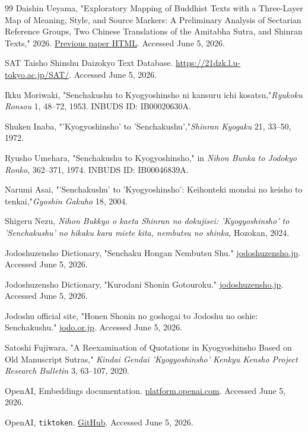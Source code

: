 \documentclass[uplatex,dvipdfmx,11pt,a4paper]{jsarticle}
\begin{document}
\begin{thebibliography}{99}
Daishin Ueyama, "Exploratory Mapping of Buddhist Texts with a Three-Layer Map of Meaning, Style, and Source Markers: A Preliminary Analysis of Sectarian Reference Groups, Two Chinese Translations of the Amitabha Sutra, and Shinran Texts," 2026. \href{https://dueyama.github.io/buddhist-text-embedding-map/paper/}{Previous paper HTML}. Accessed June 5, 2026.

SAT Taisho Shinshu Daizokyo Text Database. \href{https://21dzk.l.u-tokyo.ac.jp/SAT/}{https://21dzk.l.u-tokyo.ac.jp/SAT/}. Accessed June 5, 2026.

Ikku Moriwaki, "Senchakushu to Kyogyoshinsho ni kansuru ichi kosatsu,"\emph{Ryukoku Ronsou} 1, 48--72, 1953. INBUDS ID: IB00020630A.

Shuken Inaba, "'Kyogyoshinsho' to 'Senchakushu',"\emph{Shinran Kyogaku} 21, 33--50, 1972.

Ryusho Umehara, "Senchakushu to Kyogyoshinsho," in \emph{Nihon Bunka to Jodokyo Ronko}, 362--371, 1974. INBUDS ID: IB00046839A.

Narumi Asai, "'Senchakushu' to 'Kyogyoshinsho': Keihonteki mondai no keisho to tenkai,"\emph{Gyoshin Gakuho} 18, 2004.

Shigeru Nezu, \emph{Nihon Bukkyo o kaeta Shinran no dokujisei: 'Kyogyoshinsho' to 'Senchakushu' no hikaku kara miete kita, nembutsu no shinka}, Hozokan, 2024.

Jodoshuzensho Dictionary, "Senchaku Hongan Nembutsu Shu." \href{https://jodoshuzensho.jp/daijiten/index.php/%E9%81%B8%E6%8A%9E%E6%9C%AC%E9%A1%98%E5%BF%B5%E4%BB%8F%E9%9B%86}{jodoshuzensho.jp}. Accessed June 5, 2026.

Jodoshuzensho Dictionary, "Kurodani Shonin Gotouroku." \href{https://jodoshuzensho.jp/daijiten/index.php/%E9%BB%92%E8%B0%B7%E4%B8%8A%E4%BA%BA%E8%AA%9E%E7%81%AF%E9%8C%B2}{jodoshuzensho.jp}. Accessed June 5, 2026.

Jodoshu official site, "Honen Shonin no goshogai to Jodoshu no oshie: Senchakushu." \href{https://jodo.or.jp/newspaper/special/6226/}{jodo.or.jp}. Accessed June 5, 2026.

Satoshi Fujiwara, "A Reexamination of Quotations in Kyogyoshinsho Based on Old Manuscript Sutras," \emph{Kindai Gendai 'Kyogyoshinsho' Kenkyu Kensho Project Research Bulletin} 3, 63--107, 2020.

OpenAI, Embeddings documentation. \href{https://platform.openai.com/docs/guides/embeddings}{platform.openai.com}. Accessed June 5, 2026.

OpenAI, \texttt{tiktoken}. \href{https://github.com/openai/tiktoken}{GitHub}. Accessed June 5, 2026.

\end{thebibliography}
\end{document}
